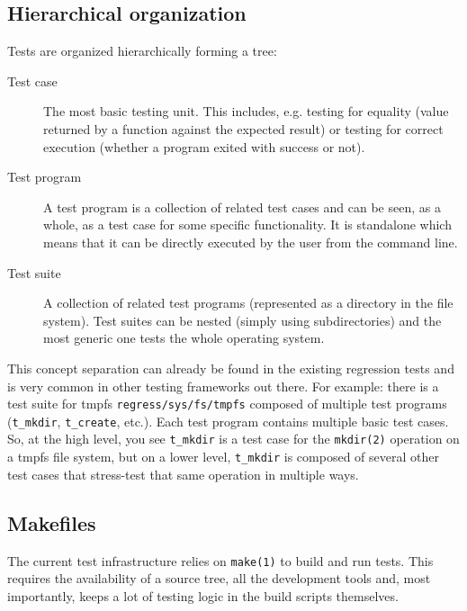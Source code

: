 \documentclass[a4paper,10pt]{article}
\begin{document}

\subsection{Hierarchical organization}

Tests are organized hierarchically forming a tree:

\begin{description}

\item [Test case]
The most basic testing unit.  This includes, e.g. testing for equality
(value returned by a function against the expected result) or testing for
correct execution (whether a program exited with success or not).

\item [Test program]
A test program is a collection of related test cases and can be seen, as a
whole, as a test case for some specific functionality.  It is standalone
which means that it can be directly executed by the user from the command
line.

\item [Test suite]
A collection of related test programs (represented as a directory in the
file system). Test suites can be nested (simply using subdirectories) and
the most generic one tests the whole operating system.

\end{description}

This concept separation can already be found in the existing regression
tests and is very common in other testing frameworks out there.  For
example: there is a test suite for tmpfs \verb*|regress/sys/fs/tmpfs|
composed of multiple test programs (\verb*|t_mkdir|, \verb*|t_create|,
etc.). Each test program contains multiple basic test cases.  So, at the
high level, you see \verb*|t_mkdir| is a test case for the \verb*|mkdir(2)|
operation on a tmpfs file system, but on a lower level, \verb*|t_mkdir| is
composed of several other test cases that stress-test that same operation
in multiple ways.


\subsection{Makefiles}

The current test infrastructure relies on \verb*|make(1)| to build and run
tests.  This requires the availability of a source tree, all the
development tools and, most importantly, keeps a lot of testing logic in
the build scripts themselves.
\end{document}

